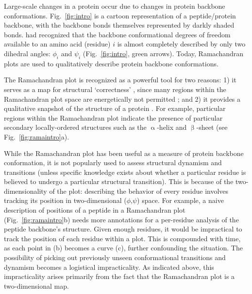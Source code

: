 \documentclass[fleqn,10pt,lineno]{wlpeerj} %
\newcommand{\Fig}[1]{Fig.~\ref{#1}}
\newcommand{\n}[1]{{\color{red}#1}}
\begin{document}
Large-scale changes in a protein occur due to changes in protein backbone conformations. %
\Fig{fig:intro} is a cartoon representation of a peptide/protein backbone, with the backbone bonds themselves represented by darkly shaded bonds. \cite{Ramachandran1963} had recognized that the backbone conformational degrees of freedom available to an amino acid (residue) $i$ is almost completely described by only two dihedral angles: $\phi_i$ and $\psi_i$ (\Fig{fig:intro}, green arrows). %
\n{Today, Ramachandran plots are used to qualitatively describe protein backbone conformations}.

The Ramachandran plot is recognized as a powerful tool for two reasons: 1) it serves as a map for structural `correctness' \citep{Laskowski1993,Hooft1997,Laskowski2003}, since many regions within the Ramachandran plot space are energetically not permitted \citep{Momen2017}; and 2) it provides a qualitative snapshot of the structure of a protein \citep{Berg2006,Alberts2002,Subramanian2001,Lovell2003}. For example, particular regions within the Ramachandran plot indicate the presence of particular secondary locally-ordered structures such as the $\upalpha$-helix and $\upbeta$-sheet (see \Fig{fig:ramaintro}a).

While the Ramachandran plot has been useful as a measure of protein backbone conformation, it is not popularly used to assess structural dynamism and transitions (unless specific knowledge exists about whether a particular residue is believed to undergo a particular structural transition). This is because of the two-dimensionality of the plot: describing the behavior of every residue involves tracking its position in two-dimensional ($\phi$,$\psi$) space. For example, a naive description of positions of a peptide in a Ramachandran plot (\Fig{fig:ramaintro}b) needs more annotations for a per-residue analysis of the peptide backbone's structure. Given enough residues, it would be impractical to track the position of each residue within a plot. This is compounded with time, as each point in (b) becomes a curve (c), further confounding the situation. The possibility of picking out previously unseen conformational transitions and dynamism becomes a logistical impracticality. As indicated above, this impracticality arises primarily from the fact that the Ramachandran plot is a two-dimensional map.
\end{document}
